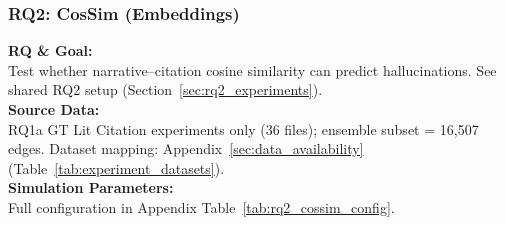 \subsubsection{RQ2: CosSim (Embeddings)}
\label{sec:rq2_cossim_embeddings}

\textbf{RQ \& Goal:}\\
Test whether narrative--citation cosine similarity can predict hallucinations. See shared RQ2 setup (Section~\ref{sec:rq2_experiments}).\\
\textbf{Source Data:}\\
RQ1a GT Lit Citation experiments only (36 files); ensemble subset = 16,507 edges. Dataset mapping: Appendix~\ref{sec:data_availability} (Table~\ref{tab:experiment_datasets}).\\
\textbf{Simulation Parameters:}\\
Full configuration in Appendix Table~\ref{tab:rq2_cossim_config}.\\

